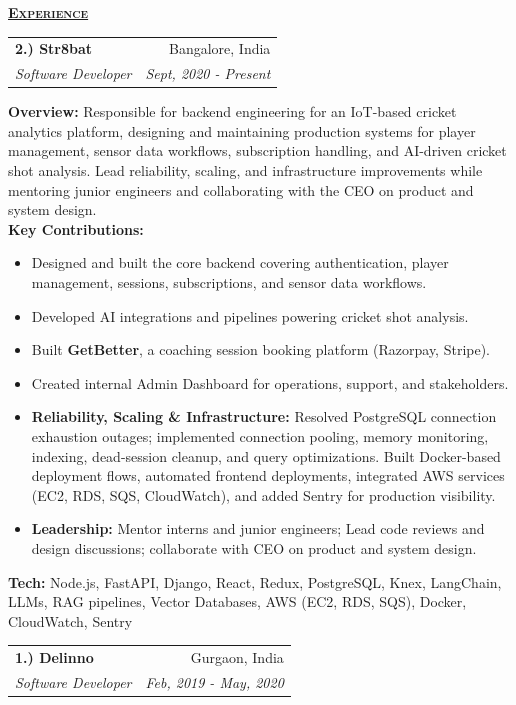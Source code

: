 \documentclass[11pt, a4paper]{article}
\begin{document}
\setlength\tabcolsep{0pt}
\begin{flushleft}
    \uline{\textsc{\large{\textbf{Experience}}}\hfill}
    \newline
    \newline
\setlength\tabcolsep{0pt}
\begin{tabularx}{\textwidth}{X r}
    \large{\textbf{2.) Str8bat}} & Bangalore, India\\
    \textit{Software Developer} & \textit {Sept, 2020 - Present}\\
\end{tabularx}

\vspace{10pt}

\textbf{Overview:} Responsible for backend engineering for an IoT-based cricket analytics platform, designing and maintaining production systems for player management, sensor data workflows, subscription handling, and AI-driven cricket shot analysis. Lead reliability, scaling, and infrastructure improvements while mentoring junior engineers and collaborating with the CEO on product and system design. \\[2mm]

\textbf{Key Contributions:}
\begin{itemize}
    \setlength{\itemsep}{0pt}
    \item Designed and built the core backend covering authentication, player management, sessions, subscriptions, and sensor data workflows.
    \item Developed AI integrations and pipelines powering cricket shot analysis.
    \item Built \textbf{GetBetter}, a coaching session booking platform (Razorpay, Stripe).
    \item Created internal Admin Dashboard for operations, support, and stakeholders.
    \item \textbf{Reliability, Scaling \& Infrastructure:} Resolved PostgreSQL connection exhaustion outages; implemented connection pooling, memory monitoring, indexing, dead-session cleanup, and query optimizations. Built Docker-based deployment flows, automated frontend deployments, integrated AWS services (EC2, RDS, SQS, CloudWatch), and added Sentry for production visibility.
    \item \textbf{Leadership:} Mentor interns and junior engineers; Lead code reviews and design discussions; collaborate with CEO on product and system design.
\end{itemize}

\textbf{Tech:} Node.js, FastAPI, Django, React, Redux, PostgreSQL, Knex, LangChain, LLMs, RAG pipelines, Vector Databases, AWS (EC2, RDS, SQS), Docker, CloudWatch, Sentry

\vspace{20pt}

    \begin{tabularx}{\textwidth}{X r}
        \large{\textbf{1.) Delinno}} & Gurgaon, India\\
        \textit{Software Developer}  & \textit {Feb, 2019 - May, 2020}\\
    \end{tabularx}
\end{flushleft}
\end{document}
